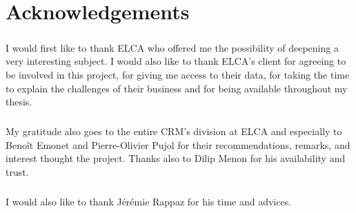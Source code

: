 \chapter*{Acknowledgements}

\vspace{0.5cm}

\paragraph{}
I would first like to thank ELCA who offered me the possibility of deepening a very interesting subject. I would also like to thank ELCA's client for agreeing to be involved in this project, for giving me access to their data, for taking the time to explain the challenges of their business and for being available throughout my thesis.

\paragraph{}
My gratitude also goes to the entire CRM's division at ELCA and especially to Benoît Emonet and Pierre-Olivier Pujol for their recommendations, remarks, and interest thought the project. Thanks also to Dilip Menon for his availability and trust.


\paragraph{}
I would also like to thank Jérémie Rappaz for his time and advices.